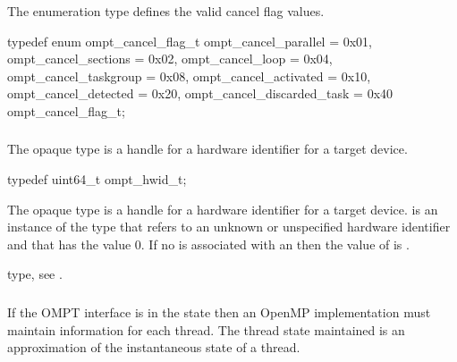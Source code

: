 \summary
The  enumeration type defines the valid cancel flag values.

\format
\begin{ccppspecific}
\begin{omptEnum}
typedef enum ompt_cancel_flag_t {
  ompt_cancel_parallel       = 0x01,
  ompt_cancel_sections       = 0x02,
  ompt_cancel_loop           = 0x04,
  ompt_cancel_taskgroup      = 0x08,
  ompt_cancel_activated      = 0x10,
  ompt_cancel_detected       = 0x20,
  ompt_cancel_discarded_task = 0x40
} ompt_cancel_flag_t;
\end{omptEnum}
\end{ccppspecific}



\subsubsection{}
\label{sec:ompt_hwid_t}

\summary
The  opaque type is a handle for a hardware identifier 
for a target device.

\format
\begin{ccppspecific}
\begin{omptOther}
typedef uint64_t ompt_hwid_t;
\end{omptOther}
\end{ccppspecific}

\descr

\label{sec:ompt_hwid_none}
The  opaque type is a handle for a hardware identifier for 
a target device.  is an instance of the type that refers 
to an unknown or unspecified hardware identifier and that has the value 0. If 
no  is associated with an  then the 
value of  is .

\begin{crossrefs}
\item {} type, 
see .
\end{crossrefs}

\subsubsection{}
\label{sec:thread-states}
\label{sec:ompt_state_t}

\summary
If the OMPT interface is in the  state then an OpenMP implementation
must maintain  information for each thread. The thread 
state maintained is an approximation of the instantaneous state of a thread.

